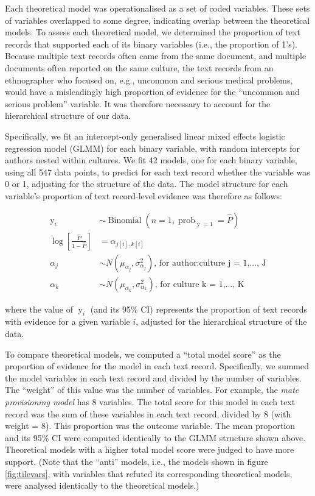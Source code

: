 \documentclass[
  11pt,
]{article}
\begin{document}
Each theoretical model was operationalised as a set of coded variables. These sets of variables overlapped to some degree, indicating overlap between the theoretical models. To assess each theoretical model, we determined the proportion of text records that supported each of its binary variables (i.e., the proportion of 1's). Because multiple text records often came from the same document, and multiple documents often reported on the same culture, the text records from an ethnographer who focused on, e.g., uncommon and serious medical problems, would have a misleadingly high proportion of evidence for the ``uncommon and serious problem'' variable. It was therefore necessary to account for the hierarchical structure of our data.

Specifically, we fit an intercept-only generalised linear mixed effects logistic regression model (GLMM) for each binary variable, with random intercepts for authors nested within cultures. We fit 42 models, one for each binary variable, using all 547 data points, to predict for each text record whether the variable was 0 or 1, adjusting for the structure of the data. The model structure for each variable's proportion of text record-level evidence was therefore as follows:

\[
\begin{aligned}
  \operatorname{y}_{i}  &\sim \operatorname{Binomial}(n = 1, \operatorname{prob}_{\operatorname{y} = 1} = \widehat{P}) \\
    \log\left[\frac{\hat{P}}{1 - \hat{P}} \right] &=\alpha_{j[i],k[i]} \\
    \alpha_{j}  &\sim N \left(\mu_{\alpha_{j}}, \sigma^2_{\alpha_{j}} \right)
    \text{, for author:culture j = 1,} \dots \text{, J} \\
    \alpha_{k}  &\sim N \left(\mu_{\alpha_{k}}, \sigma^2_{\alpha_{k}} \right)
    \text{, for culture k = 1,} \dots \text{, K}
\end{aligned}
\]

where the value of \(\operatorname{y}_{i}\) (and its 95\% CI) represents the proportion of text records with evidence for a given variable \(i\), adjusted for the hierarchical structure of the data.

To compare theoretical models, we computed a ``total model score'' as the proportion of evidence for the model in each text record. Specifically, we summed the model variables in each text record and divided by the number of variables. The ``weight'' of this value was the number of variables. For example, the \emph{mate provisioning model} has 8 variables. The total score for this model in each text record was the sum of these variables in each text record, divided by 8 (with weight = 8). This proportion was the outcome variable. The mean proportion and its 95\% CI were computed identically to the GLMM structure shown above. Theoretical models with a higher total model score were judged to have more support. (Note that the ``anti'' models, i.e., the models shown in figure \ref{fig:tilevars}, with variables that refuted its corresponding theoretical models, were analysed identically to the theoretical models.)
\end{document}
